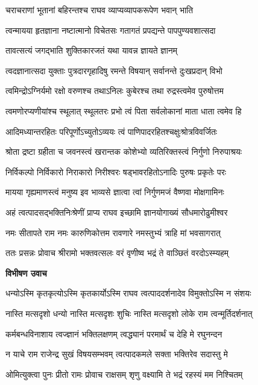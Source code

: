\twolineshloka
{चराचराणां भूतानां बहिरन्तश्च राघव}
{व्याप्यव्यापकरूपेण भवान् भाति} %

\twolineshloka
{त्वन्मायया हृतज्ञाना नष्टात्मानो विचेतसः}
{गतागतं प्रपद्यन्ते पापपुण्यवशात्सदा} %

\twolineshloka
{तावत्सत्यं जगद्भाति शुक्तिकारजतं यथा}
{यावन्न ज्ञायते ज्ञानम्} %

\twolineshloka
{त्वदज्ञानात्सदा युक्ताः पुत्रदारगृहादिषु}
{रमन्ते विषयान् सर्वानन्ते दुःखप्रदान् विभो} %

\twolineshloka
{त्वमिन्द्रोऽग्निर्यमो रक्षो वरुणश्च तथाऽनिलः}
{कुबेरश्च तथा रुद्रस्त्वमेव पुरुषोत्तम} %

\twolineshloka
{त्वमणोरप्यणीयांश्च स्थूलात् स्थूलतरः प्रभो}
{त्वं पिता सर्वलोकानां माता धाता त्वमेव हि} %

\twolineshloka
{आदिमध्यान्तरहितः परिपूर्णोऽच्युतोऽव्ययः}
{त्वं पाणिपादरहितश्चक्षुःश्रोत्रविवर्जितः} %

\twolineshloka
{श्रोता द्रष्टा ग्रहीता च जवनस्त्वं खरान्तक}
{कोशेभ्यो व्यतिरिक्तस्त्वं निर्गुणो निरुपाश्रयः} %

\twolineshloka
{निर्विकल्पो निर्विकारो निराकारो निरीश्वरः}
{षड्भावरहितोऽनादिः पुरुषः प्रकृतेः परः} %

\twolineshloka
{मायया गृह्यमाणस्त्वं मनुष्य इव भाव्यसे}
{ज्ञात्वा त्वां निर्गुणमजं वैष्णवा मोक्षगामिनः} %

\twolineshloka
{अहं त्वत्पादसद्भक्तिनिःश्रेणीं प्राप्य राघव}
{इच्छामि ज्ञानयोगाख्यं सौधमारोढुमीश्वर} %

\twolineshloka
{नमः सीतापते राम नमः कारुणिकोत्तम}
{रावणारे नमस्तुभ्यं त्राहि मां भवसागरात्} %

\twolineshloka
{ततः प्रसन्नः प्रोवाच श्रीरामो भक्तवत्सलः}
{वरं वृणीष्व भद्रं ते वाञ्छितं वरदोऽस्म्यहम्} %

\textbf{विभीषण उवाच}

\twolineshloka
{धन्योऽस्मि कृतकृत्योऽस्मि कृतकार्योऽस्मि राघव}
{त्वत्पाददर्शनादेव विमुक्तोऽस्मि न संशयः} %

\twolineshloka
{नास्ति मत्सदृशो धन्यो नास्ति मत्सदृशः शुचिः}
{नास्ति मत्सदृशो लोके राम त्वन्मूर्तिदर्शनात्} %

\twolineshloka
{कर्मबन्धविनाशाय त्वज्ज्ञानं भक्तिलक्षणम्}
{त्वद्ध्यानं परमार्थं च देहि मे रघुनन्दन} %

\twolineshloka
{न याचे राम राजेन्द्र सुखं विषयसम्भवम्}
{त्वत्पादकमले सक्ता भक्तिरेव सदास्तु मे} %

\twolineshloka
{ओमित्युक्त्वा पुनः प्रीतो रामः प्रोवाच राक्षसम्}
{शृणु वक्ष्यामि ते भद्रं रहस्यं मम निश्चितम्} %

